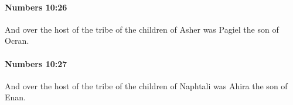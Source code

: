 		\paragraph{Numbers 10:26} %
			\label{NUMBERS-10-26}

			And over the host of the tribe of the children of Asher was Pagiel the son of Ocran.


		\paragraph{Numbers 10:27} %
			\label{NUMBERS-10-27}

			And over the host of the tribe of the children of Naphtali was Ahira the son of Enan.


